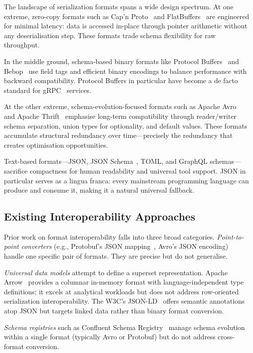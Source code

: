 \documentclass[11pt,a4paper]{article}
\theoremstyle{definition}
\theoremstyle{remark}
\begin{document}
The landscape of serialization formats spans a wide design spectrum.
At one extreme, zero-copy formats such as Cap'n
Proto~\cite{capnproto} and FlatBuffers~\cite{flatbuffers} are
engineered for minimal latency: data is accessed in-place through
pointer arithmetic without any deserialisation step. These formats
trade schema flexibility for raw throughput.

In the middle ground, schema-based binary formats like Protocol
Buffers~\cite{protobuf} and Bebop~\cite{bebop} use field tags and
efficient binary encodings to balance performance with backward
compatibility. Protocol Buffers in particular have become a de facto
standard for gRPC~\cite{grpc} services.

At the other extreme, schema-evolution-focused formats such as Apache
Avro~\cite{avro} and Apache Thrift~\cite{thrift} emphasise long-term
compatibility through reader/writer schema separation, union types for
optionality, and default values. These formats accumulate structural
redundancy over time---precisely the redundancy that creates optimisation
opportunities.

Text-based formats---JSON, JSON Schema~\cite{jsonschema}, TOML, and
GraphQL schemas---sacrifice compactness for human readability and
universal tool support. JSON in particular serves as a lingua franca:
every mainstream programming language can produce and consume it,
making it a natural universal fallback.

\subsection{Existing Interoperability Approaches}

Prior work on format interoperability falls into three broad categories.
\emph{Point-to-point converters} (e.g., Protobuf's JSON
mapping~\cite{protobuf}, Avro's JSON encoding) handle one specific pair
of formats. They are precise but do not generalise.

\emph{Universal data models} attempt to define a superset
representation. Apache Arrow~\cite{arrow} provides a columnar in-memory
format with language-independent type definitions; it excels at
analytical workloads but does not address row-oriented serialization
interoperability. The W3C's JSON-LD~\cite{jsonld} offers semantic
annotations atop JSON but targets linked data rather than binary format
conversion.

\emph{Schema registries} such as Confluent Schema
Registry~\cite{confluent} manage schema evolution within a single format
(typically Avro or Protobuf) but do not address cross-format conversion.
\end{document}
